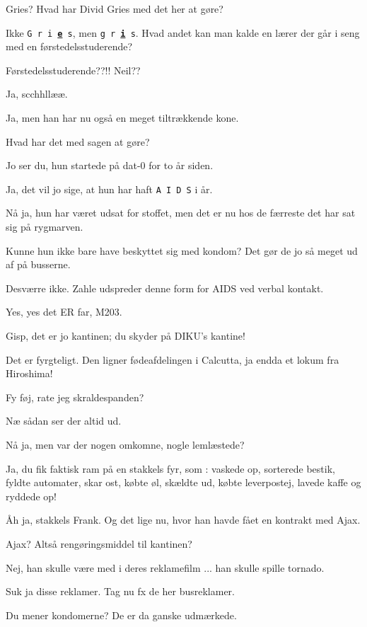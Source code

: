 \documentclass[a4paper,11pt]{article}
\begin{document}
\begin{sketch}
 Gries? Hvad har Divid Gries med det her at gøre?

 Ikke \texttt{G r i \underline{\textbf{e}} s}, men 
\texttt{g r \underline{\textbf{i}} s}. Hvad andet kan man kalde en lærer der går
i seng med en førstedelsstuderende?

 Førstedelsstuderende??!! Neil??

 Ja, scchhllææ.

 Ja, men han har nu også en meget tiltrækkende kone.

 Hvad har det med sagen at gøre?

 Jo ser du, hun startede på dat-0 for to år siden.

 Ja, det vil jo sige, at hun har haft \texttt{A I D S} i år.

 Nå ja, hun har været udsat for stoffet, men det er nu hos de færreste
det har sat sig på rygmarven.

 Kunne hun ikke bare have beskyttet sig med kondom? Det gør de jo så
meget ud af på busserne.

 Desværre ikke. Zahle udspreder denne form for AIDS ved verbal kontakt.

 Yes, yes det ER far, M203.

 Gisp, det er jo kantinen; du skyder på DIKU's kantine!


 Det er fyrgteligt. Den ligner fødeafdelingen i Calcutta, ja endda et
lokum fra Hiroshima!

 Fy føj, rate jeg skraldespanden?

 Næ sådan ser der altid ud.

 Nå ja, men var der nogen omkomne, nogle lemlæstede?

 Ja, du fik faktisk ram på en stakkels fyr, som : vaskede op, sorterede
bestik, fyldte automater, skar ost, købte øl, skældte ud, købte leverpostej,
lavede kaffe og ryddede op!

 Åh ja, stakkels Frank. Og det lige nu, hvor han havde fået en kontrakt
med Ajax.

 Ajax? Altså rengøringsmiddel til kantinen?

 Nej, han skulle være med i deres reklamefilm ... han skulle spille
tornado.

 Suk ja disse reklamer. Tag nu fx de her busreklamer.

 Du mener kondomerne? De er da ganske udmærkede.


\end{sketch}
\end{document}
